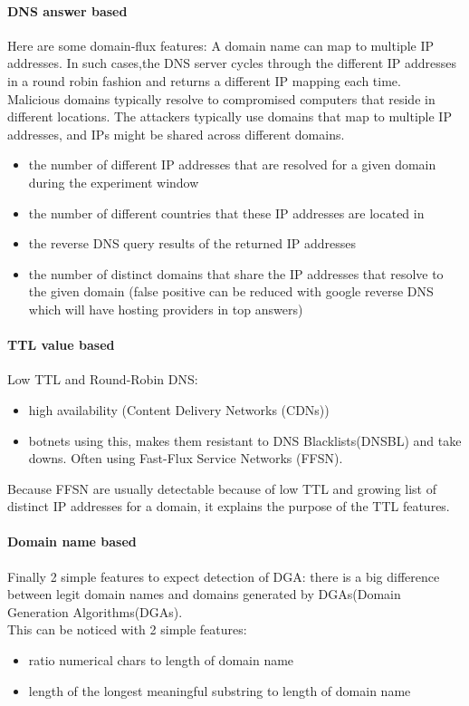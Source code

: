 \paragraph{DNS answer based}
Here are some domain-flux features: A domain name can map to multiple IP addresses. In such cases,the DNS server cycles through the different IP addresses in a round robin fashion and returns a different IP mapping each time. \\
Malicious domains typically resolve to compromised computers that reside in different locations. The attackers typically use domains that map to multiple IP addresses, and IPs might be shared across different domains.
\begin{itemize}[noitemsep]
\item the number of different IP addresses that are resolved for a given domain during the experiment window
\item the number of different countries that these IP addresses are located in
\item the reverse DNS query results of the returned IP addresses
\item the number of distinct domains that share the IP addresses that resolve to the given domain (false positive can be reduced with google reverse DNS which will have hosting providers in top answers)
\end{itemize}
\paragraph{TTL value based}
Low TTL and Round-Robin DNS: \\
\begin{itemize}[noitemsep]
\item high availability (Content Delivery Networks (CDNs))
\item botnets using this, makes them resistant to DNS Blacklists(DNSBL) and take downs. Often using Fast-Flux Service Networks (FFSN).
\end{itemize}
Because FFSN are usually detectable because of low TTL and growing list of distinct IP addresses for a domain, it explains the purpose of the TTL features.
\paragraph{Domain name based}
Finally 2 simple features to expect detection of DGA: there is a big difference between legit domain names and domains generated by DGAs(Domain Generation Algorithms(DGAs).\\
This can be noticed with 2 simple features:\\
\begin{itemize}[noitemsep]
\item ratio numerical chars to length of domain name
\item length of the longest meaningful substring to length of domain name
\end{itemize}



